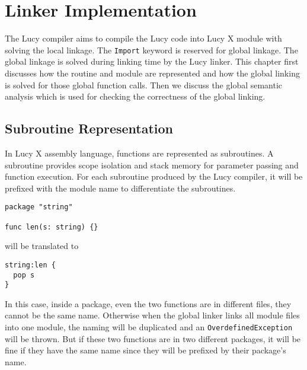 \chapter{Linker Implementation}
The Lucy compiler aims to compile the Lucy code into Lucy X module with solving the local linkage. The \texttt{Import} keyword is reserved for global linkage. The global linkage is solved during linking time by the Lucy linker. This chapter first discusses how the routine and module are represented and how the global linking is solved for those global function calls. Then we discuss the global semantic analysis which is used for checking the correctness of the global linking.


\section{Subroutine Representation}
In Lucy X assembly language, functions are represented as subroutines. A subroutine provides scope isolation and stack memory for parameter passing and function execution. For each subroutine produced by the Lucy compiler, it will be prefixed with the module name to differentiate the subroutines.
\begin{lstlisting}
package "string"

func len(s: string) {}
\end{lstlisting}
will be translated to
\begin{lstlisting}[language=LucyX]
string:len {
  pop s
}
\end{lstlisting}
In this case, inside a package, even the two functions are in different files, they cannot be the same name. Otherwise when the global linker links all module files into one module, the naming will be duplicated and an \texttt{OverdefinedException} will be thrown. But if these two functions are in two different packages, it will be fine if they have the same name since they will be prefixed by their package's name.

